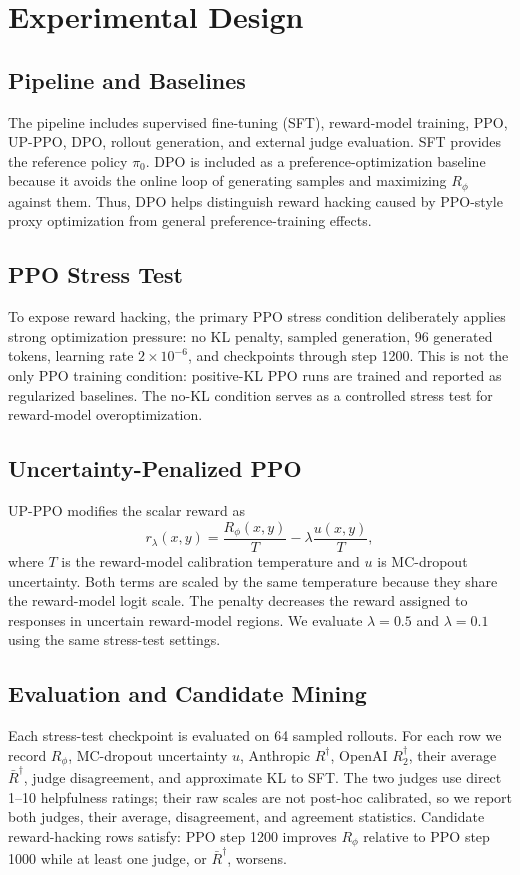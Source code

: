 \documentclass[11pt]{article}
\newcommand{\Rphi}{R_{\phi}}
\newcommand{\Rdag}{R^{\dagger}}
\newcommand{\Rtwo}{R^{\dagger}_2}
\begin{document}
\section{Experimental Design}
\subsection{Pipeline and Baselines}
The pipeline includes supervised fine-tuning (SFT), reward-model training, PPO, UP-PPO, DPO, rollout generation, and external judge evaluation. SFT provides the reference policy $\pi_0$. DPO is included as a preference-optimization baseline because it avoids the online loop of generating samples and maximizing $\Rphi$ against them. Thus, DPO helps distinguish reward hacking caused by PPO-style proxy optimization from general preference-training effects.

\subsection{PPO Stress Test}
To expose reward hacking, the primary PPO stress condition deliberately applies strong optimization pressure: no KL penalty, sampled generation, 96 generated tokens, learning rate $2\times 10^{-6}$, and checkpoints through step 1200. This is not the only PPO training condition: positive-KL PPO runs are trained and reported as regularized baselines. The no-KL condition serves as a controlled stress test for reward-model overoptimization.

\subsection{Uncertainty-Penalized PPO}
UP-PPO modifies the scalar reward as
\begin{equation}
    r_\lambda(x,y)=\frac{\Rphi(x,y)}{T}-\lambda\frac{u(x,y)}{T},
\end{equation}
where $T$ is the reward-model calibration temperature and $u$ is MC-dropout uncertainty. Both terms are scaled by the same temperature because they share the reward-model logit scale. The penalty decreases the reward assigned to responses in uncertain reward-model regions. We evaluate $\lambda=0.5$ and $\lambda=0.1$ using the same stress-test settings.


\subsection{Evaluation and Candidate Mining}
Each stress-test checkpoint is evaluated on 64 sampled rollouts. For each row we record $\Rphi$, MC-dropout uncertainty $u$, Anthropic $\Rdag$, OpenAI $\Rtwo$, their average $\bar R^\dagger$, judge disagreement, and approximate KL to SFT. The two judges use direct 1--10 helpfulness ratings; their raw scales are not post-hoc calibrated, so we report both judges, their average, disagreement, and agreement statistics. Candidate reward-hacking rows satisfy: PPO step 1200 improves $\Rphi$ relative to PPO step 1000 while at least one judge, or $\bar R^\dagger$, worsens.
\end{document}
